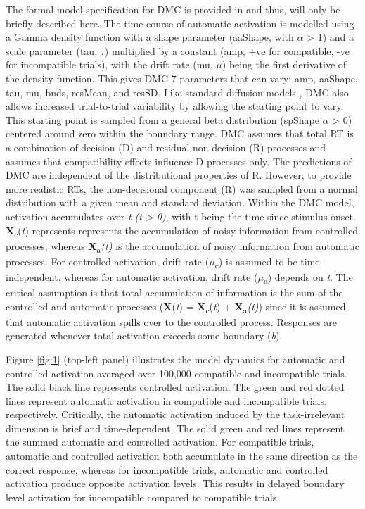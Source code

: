 The formal model specification for DMC is provided in
\textcite{ulrich2015automatic} and thus, will only be briefly described here.
The time-course of automatic activation is modelled using a Gamma density
function with a shape parameter (aaShape, with $\alpha$ > 1) and a scale
parameter (tau, $\tau$) multiplied by a constant (amp, +ve for compatible, -ve
for incompatible trials), with the drift rate (mu, $\mu$) being the first
derivative of the density function. This gives DMC 7 parameters that can vary:
amp, aaShape, tau, mu, bnds, resMean, and resSD. Like standard diffusion models
\parencite[see][]{ratcliff2013parameter}, DMC also allows increased
trial-to-trial variability by allowing the starting point to vary. This
starting point is sampled from a general beta distribution (spShape $\alpha$ >
0) centered around zero within the boundary range. DMC assumes that total RT is
a combination of decision (D) and residual non-decision (R) processes and
assumes that compatibility effects influence D processes only. The predictions
of DMC are independent of the distributional properties of R. However, to
provide more realistic RTs, the non-decisional component (R) was sampled from a
normal distribution with a given mean and standard deviation. Within the DMC
model, activation accumulates over \textit{t (t > 0)}, with t being the time
since stimulus onset. \textbf{X}\textsubscript{c}(\textit{t}) represents
represents the accumulation of noisy information from controlled processes,
whereas \textbf{X}\textsubscript{a}\textit{(t)} is the accumulation of noisy
information from automatic processes. For controlled activation, drift rate
(\textit{$\mu$}\textsubscript{c}) is assumed to be time-independent, whereas
for automatic activation, drift rate (\textit{$\mu$}\textsubscript{a}) depends
on \textit{t}. The critical assumption is that total accumulation of
information is the sum of the controlled and automatic processes
(\textbf{X}(\textit{t}) = \textbf{X}\textsubscript{c}(\textit{t}) +
\textbf{X}\textsubscript{a}\textit{(t)}) since it is assumed that automatic
activation spills over to the controlled process. Responses are generated
whenever total activation exceeds some boundary (\textit{b}). 

Figure \ref{fig:1} (top-left panel) illustrates the model dynamics for
automatic and controlled activation averaged over 100,000 compatible and
incompatible trials. The solid black line represents controlled activation. The
green and red dotted lines represent automatic activation in compatible and
incompatible trials, respectively. Critically, the automatic activation induced
by the task-irrelevant dimension is brief and time-dependent. The solid green
and red lines represent the summed automatic and controlled activation. For
compatible trials, automatic and controlled activation both accumulate in the
same direction as the correct response, whereas for incompatible trials,
automatic and controlled activation produce opposite activation levels. This
results in delayed boundary level activation for incompatible compared to
compatible trials.

